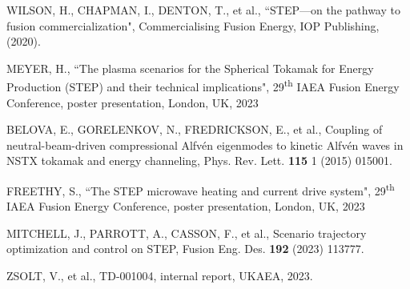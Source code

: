 \documentclass[10pt, a4paper, twoside]{article}
\begin{document}
\fontsize{9}{12}\selectfont
\setlength{\parskip}{0pt}
\begin{thebibliography}{9}

    WILSON, H., CHAPMAN, I., DENTON, T., et al., 
    ``STEP---on the pathway to fusion commercialization", 
    Commercialising Fusion Energy, 
    IOP Publishing, 
    (2020).

    MEYER, H.,
    ``The plasma scenarios for the Spherical Tokamak for Energy Production (STEP) and their technical implications",
    29\textsuperscript{th} IAEA Fusion Energy Conference,
    poster presentation, 
    London, UK, 
    2023

    BELOVA, E., GORELENKOV, N., FREDRICKSON, E., et al., 
    Coupling of neutral-beam-driven compressional Alfv\'en eigenmodes to kinetic Alfv\'en waves in NSTX tokamak and energy channeling, 
    Phys. Rev. Lett. 
    \textbf{115} 1 
    (2015) 
    015001.

    FREETHY, S.,
    ``The STEP microwave heating and current drive system",
    29\textsuperscript{th} IAEA Fusion Energy Conference,
    poster presentation, 
    London, UK, 
    2023

    MITCHELL, J., PARROTT, A., CASSON, F., et al.,
    Scenario trajectory optimization and control on STEP,
    Fusion Eng. Des.
    \textbf{192} 
    (2023) 
    113777.

    ZSOLT, V., et al., 
    TD-001004, 
    internal report, 
    UKAEA, 
    2023.


\end{thebibliography}
\end{document}
